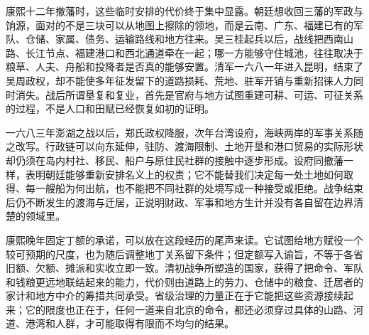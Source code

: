 康熙十二年撤藩时，这些临时安排的代价终于集中显露。朝廷想收回三藩的军政与饷源，面对的不是三块可以从地图上擦除的领地，而是云南、广东、福建已有的军队、仓储、家属、债务、运输路线和地方往来。吴三桂起兵以后，战线把西南山路、长江节点、福建港口和西北通道牵在一起；哪一方能够守住城池，往往取决于粮草、人夫、舟船和投降者是否真的能够安置。清军一六八一年进入昆明，结束了吴周政权，却不能使多年征发留下的道路损耗、荒地、驻军开销与重新招徕人力同时消失。战后所谓垦复和复业，首先是官府与地方试图重建可耕、可运、可征关系的过程，不是人口和田赋已经恢复如初的证明。

一六八三年澎湖之战以后，郑氏政权降服，次年台湾设府，海峡两岸的军事关系随之改写。行政链可以向东延伸，驻防、渡海限制、土地开垦和港口贸易的实际形状却仍须在岛内村社、移民、船户与原住民社群的接触中逐步形成。设府同撤藩一样，表明朝廷能够重新安排名义上的权责；它不能替我们决定每一处土地如何取得、每一艘船为何出航，也不能把不同社群的处境写成一种接受或拒绝。战争结束后仍不断发生的渡海与迁居，正说明财政、军事和地方生计并没有各自留在边界清楚的领域里。

康熙晚年固定丁额的承诺，可以放在这段经历的尾声来读。它试图给地方赋役一个较可预期的尺度，也为随后调整地丁关系留下条件；但定额写入谕旨，不等于各省旧额、欠额、摊派和实收立即一致。清初战争所塑造的国家，获得了把命令、军队和钱粮更远地联结起来的能力，代价则由道路上的劳力、仓储中的粮食、迁居者的家计和地方中介的筹措共同承受。省级治理的力量正在于它能把这些资源接续起来；它的限度也正在于，任何一道来自北京的命令，都还必须穿过具体的山路、河道、港湾和人群，才可能取得有限而不均匀的结果。
